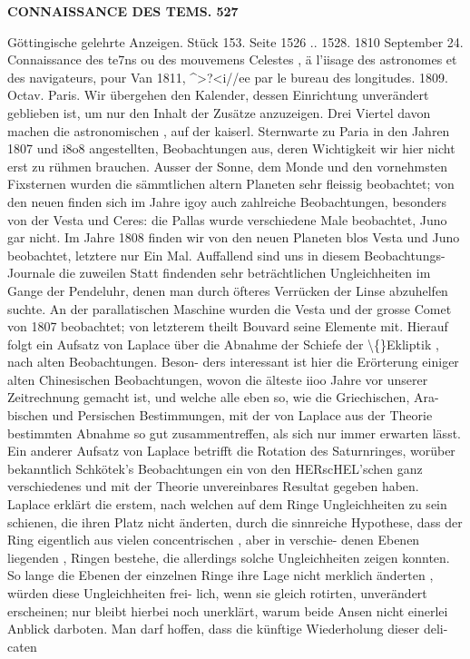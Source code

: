 \documentclass[12pt,a4paper]{article}
\begin{document}
\vspace{0.5em}


\noindent\textbf{CONNAISSANCE  DES  TEMS.  527}

Göttingische  gelehrte  Anzeigen.     Stück  153.     Seite  1526 ..  1528.     1810  September  24. Connaissance  des  te7ns  ou  des  mouvemens  Celestes ,  ä  l'iisage  des  astronomes  et  des  navigateurs, pour  Van  1811,  \textasciicircum{}>?<i//ee  par  le  bureau  des  longitudes.     1809.     Octav.      Paris. Wir  übergehen  den  Kalender,  dessen  Einrichtung  unverändert  geblieben  ist,  um  nur  den  Inhalt der  Zusätze  anzuzeigen.  Drei  Viertel  davon  machen  die  astronomischen ,  auf  der  kaiserl.  Sternwarte  zu Paria  in  den  Jahren  1807  und  i8o8  angestellten,  Beobachtungen  aus,  deren  Wichtigkeit  wir  hier  nicht erst  zu  rühmen  brauchen.  Ausser  der  Sonne,  dem  Monde  und  den  vornehmsten  Fixsternen  wurden  die sämmtlichen  altern  Planeten  sehr  fleissig  beobachtet;  von  den  neuen  finden  sich  im  Jahre  igoy  auch zahlreiche  Beobachtungen,  besonders  von  der  Vesta  und  Ceres:  die  Pallas  wurde  verschiedene  Male beobachtet,  Juno  gar  nicht.  Im  Jahre  1808  finden  wir  von  den  neuen  Planeten  blos  Vesta  und  Juno beobachtet,  letztere  nur  Ein  Mal.  Auffallend  sind  uns  in  diesem  Beobachtungs- Journale  die  zuweilen Statt  findenden  sehr  beträchtlichen  Ungleichheiten  im  Gange  der  Pendeluhr,  denen  man  durch  öfteres Verrücken  der  Linse  abzuhelfen  suchte.  An  der  parallatischen  Maschine  wurden  die  Vesta  und  der grosse  Comet  von  1807  beobachtet;  von  letzterem  theilt  Bouvard  seine  Elemente  mit.  Hierauf  folgt  ein Aufsatz  von  Laplace  über  die  Abnahme  der  Schiefe  der  \textbackslash\{\}Ekliptik ,  nach  alten  Beobachtungen.  Beson- ders interessant  ist  hier  die  Erörterung  einiger  alten  Chinesischen  Beobachtungen,  wovon  die  älteste iioo  Jahre  vor  unserer  Zeitrechnung  gemacht  ist,  und  welche  alle  eben  so,  wie  die  Griechischen,  Ara- bischen und  Persischen  Bestimmungen,  mit  der  von  Laplace  aus  der  Theorie  bestimmten  Abnahme  so gut  zusammentreffen,  als  sich  nur  immer  erwarten  lässt.  Ein  anderer  Aufsatz  von  Laplace  betrifft  die Rotation  des  Saturnringes,  worüber  bekanntlich  Schkötek's  Beobachtungen  ein  von  den  HERscHEL'schen ganz  verschiedenes  und  mit  der  Theorie  unvereinbares  Resultat  gegeben  haben.  Laplace  erklärt  die erstem,  nach  welchen  auf  dem  Ringe  Ungleichheiten  zu  sein  schienen,  die  ihren  Platz  nicht  änderten, durch  die  sinnreiche  Hypothese,  dass  der  Ring  eigentlich  aus  vielen  concentrischen ,  aber  in  verschie- denen Ebenen  liegenden ,  Ringen  bestehe,  die  allerdings  solche  Ungleichheiten  zeigen  konnten.  So  lange die  Ebenen  der  einzelnen  Ringe  ihre  Lage  nicht  merklich  änderten ,  würden  diese  Ungleichheiten  frei- lich, wenn  sie  gleich  rotirten,  unverändert  erscheinen;  nur  bleibt  hierbei  noch  unerklärt,  warum  beide Ansen  nicht  einerlei  Anblick  darboten.  Man  darf  hoffen,  dass  die  künftige  Wiederholung  dieser  deli- caten  
\end{document}
